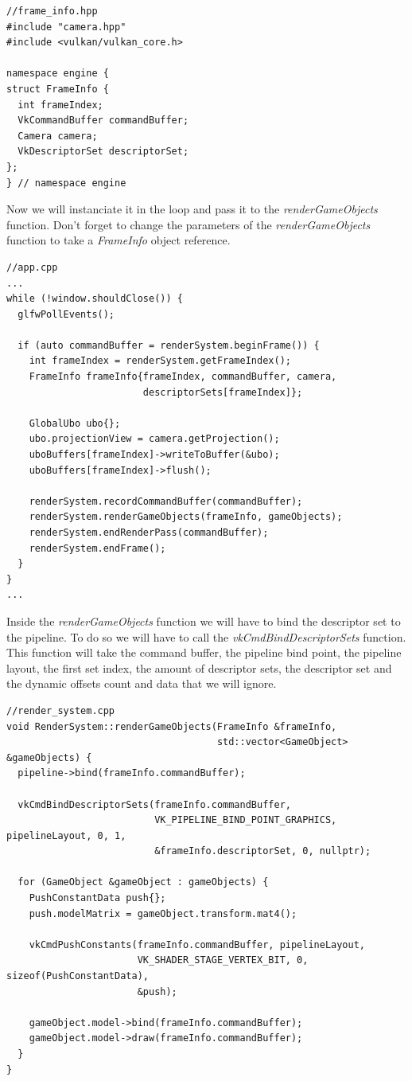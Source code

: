 \documentclass[12pt]{report} \usepackage{preamble}
\begin{document}
\begin{lstlisting}[Language=C++]
//frame_info.hpp
#include "camera.hpp"
#include <vulkan/vulkan_core.h>

namespace engine {
struct FrameInfo {
  int frameIndex;
  VkCommandBuffer commandBuffer;
  Camera camera;
  VkDescriptorSet descriptorSet;
};
} // namespace engine
\end{lstlisting}

Now we will instanciate it in the loop and pass it to the \textit{renderGameObjects} function.
Don't forget to change the parameters of the \textit{renderGameObjects} function to take a \textit{FrameInfo} object reference.

\begin{lstlisting}[Language=C++]
//app.cpp
...
while (!window.shouldClose()) {
  glfwPollEvents();

  if (auto commandBuffer = renderSystem.beginFrame()) {
    int frameIndex = renderSystem.getFrameIndex();
    FrameInfo frameInfo{frameIndex, commandBuffer, camera,
                        descriptorSets[frameIndex]};

    GlobalUbo ubo{};
    ubo.projectionView = camera.getProjection();
    uboBuffers[frameIndex]->writeToBuffer(&ubo);
    uboBuffers[frameIndex]->flush();

    renderSystem.recordCommandBuffer(commandBuffer);
    renderSystem.renderGameObjects(frameInfo, gameObjects);
    renderSystem.endRenderPass(commandBuffer);
    renderSystem.endFrame();
  }
}
...
\end{lstlisting}

Inside the \textit{renderGameObjects} function we will have to bind the descriptor set to the pipeline.
To do so we will have to call the \textit{vkCmdBindDescriptorSets} function. This function will take the command buffer, the pipeline bind point, the pipeline layout, the first set index,
the amount of descriptor sets, the descriptor set and the dynamic offsets count and data that we will ignore.

\begin{lstlisting}[Language=C++]
//render_system.cpp
void RenderSystem::renderGameObjects(FrameInfo &frameInfo,
                                     std::vector<GameObject> &gameObjects) {
  pipeline->bind(frameInfo.commandBuffer);

  vkCmdBindDescriptorSets(frameInfo.commandBuffer,
                          VK_PIPELINE_BIND_POINT_GRAPHICS, pipelineLayout, 0, 1,
                          &frameInfo.descriptorSet, 0, nullptr);

  for (GameObject &gameObject : gameObjects) {
    PushConstantData push{};
    push.modelMatrix = gameObject.transform.mat4();

    vkCmdPushConstants(frameInfo.commandBuffer, pipelineLayout,
                       VK_SHADER_STAGE_VERTEX_BIT, 0, sizeof(PushConstantData),
                       &push);

    gameObject.model->bind(frameInfo.commandBuffer);
    gameObject.model->draw(frameInfo.commandBuffer);
  }
}
\end{lstlisting}
\end{document}
